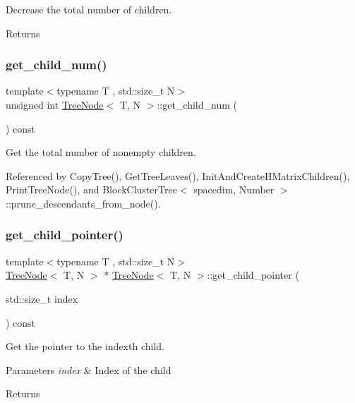 Decrease the total number of children. \begin{DoxyReturn}{Returns}

\end{DoxyReturn}
\mbox{\label{classTreeNode_a077cb5cc974f94ff431c69cc2ca5957f}} 
\subsubsection{\texorpdfstring{get\+\_\+child\+\_\+num()}{get\_child\_num()}}
{\footnotesize\ttfamily template$<$typename T , std\+::size\+\_\+t N$>$ \\
unsigned int \hyperlink{classTreeNode}{Tree\+Node}$<$ T, N $>$\+::get\+\_\+child\+\_\+num (\begin{DoxyParamCaption}{ }\end{DoxyParamCaption}) const}

Get the total number of nonempty children. 

Referenced by Copy\+Tree(), Get\+Tree\+Leaves(), Init\+And\+Create\+H\+Matrix\+Children(), Print\+Tree\+Node(), and Block\+Cluster\+Tree$<$ spacedim, Number $>$\+::prune\+\_\+descendants\+\_\+from\+\_\+node().

\mbox{\label{classTreeNode_ad3b1833452c787d2146a4beb3587c531}} 
\subsubsection{\texorpdfstring{get\+\_\+child\+\_\+pointer()}{get\_child\_pointer()}}
{\footnotesize\ttfamily template$<$typename T , std\+::size\+\_\+t N$>$ \\
\hyperlink{classTreeNode}{Tree\+Node}$<$ T, N $>$ $\ast$ \hyperlink{classTreeNode}{Tree\+Node}$<$ T, N $>$\+::get\+\_\+child\+\_\+pointer (\begin{DoxyParamCaption}\item[{std\+::size\+\_\+t}]{index }\end{DoxyParamCaption}) const}

Get the pointer to the {\ttfamily index\textquotesingle{}th} child. 
\begin{DoxyParams}{Parameters}
{\em index} & Index of the child \\
\hline
\end{DoxyParams}
\begin{DoxyReturn}{Returns}

\end{DoxyReturn}


